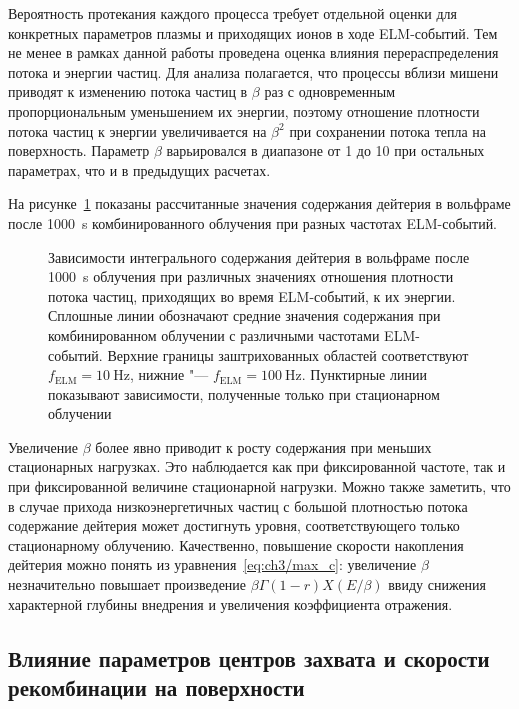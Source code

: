 Вероятность протекания каждого процесса требует отдельной оценки для конкретных параметров плазмы и приходящих ионов в ходе ELM-событий. Тем не менее в рамках данной работы проведена оценка влияния перераспределения потока и энергии частиц. Для анализа полагается, что процессы вблизи мишени приводят к изменению потока частиц в \( \beta \) раз с одновременным пропорциональным уменьшением их энергии, поэтому отношение плотности потока частиц к энергии увеличивается на $\beta^2$ при сохранении потока тепла на поверхность. Параметр $\beta$ варьировался в диапазоне от 1 до 10 при остальных параметрах, что и в предыдущих расчетах. 

На рисунке~\cref{fig:ch3/beta_var} показаны рассчитанные значения содержания дейтерия в вольфраме после \SI{1000}{\second} комбинированного облучения при разных частотах ELM-событий. 
\begin{figure}[bt]
	\caption{Зависимости интегрального содержания дейтерия в вольфраме после \SI{1000}{\second} облучения при различных значениях отношения плотности потока частиц, приходящих во время ELM-событий, к их энергии. Сплошные линии обозначают средние значения содержания при комбинированном облучении с различными частотами ELM-событий. Верхние границы заштрихованных областей соответствуют \(f_\mathrm{ELM} = \SI{10}{\hertz}\), нижние "--- \(f_\mathrm{ELM} = \SI{100}{\hertz}\). Пунктирные линии показывают зависимости, полученные только при стационарном облучении}\label{fig:ch3/beta_var}
\end{figure}
Увеличение $\beta$ более явно приводит к росту содержания при меньших стационарных нагрузках. Это наблюдается как при фиксированной частоте, так и при фиксированной величине стационарной нагрузки. Можно также заметить, что в случае прихода низкоэнергетичных частиц с большой плотностью потока содержание дейтерия может достигнуть уровня, соответствующего только стационарному облучению. Качественно, повышение скорости накопления дейтерия можно понять из уравнения~\cref{eq:ch3/max_c}: увеличение $\beta$ незначительно повышает произведение $\beta\Gamma (1-r) X(E/\beta)$ ввиду снижения характерной глубины внедрения и увеличения коэффициента отражения. 

\subsection{Влияние параметров центров захвата и скорости рекомбинации на поверхности}


